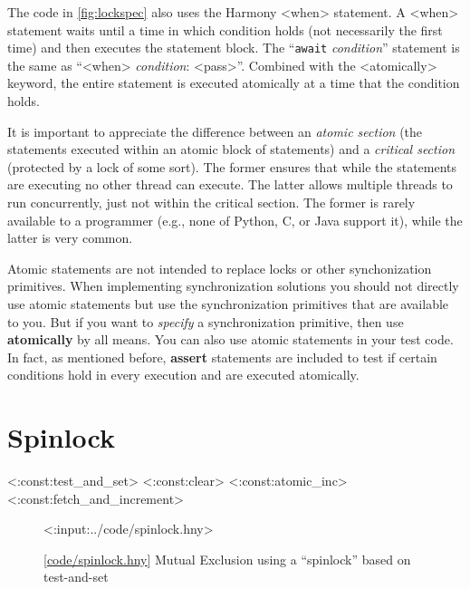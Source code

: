 \documentclass{report}
\newcommand{\harmonylink}[1]{%
[\href{https://harmony.cs.cornell.edu/#1}{\underline{#1}}]%
}
\newenvironment{code}{
\tcolorbox
}{
\endtcolorbox
}
\begin{document}
The code in \autoref{fig:lockspec} also uses the Harmony <{when}>
statement.  A <{when}> statement waits until a time in which
condition holds (not necessarily the first time) and then executes the
statement block.  The ``\texttt{await} \textit{condition}'' statement is
the same as ``<{when}> \textit{condition}: <{pass}>''.
Combined with the <{atomically}> keyword, the entire statement
is executed atomically at a time that the condition holds.

It is important to appreciate the difference between an
\emph{atomic section} (the statements executed within an
atomic block of statements) and a \emph{critical section}
(protected by a lock of some sort).
The former ensures that while the
statements are executing no other thread can execute.
The latter allows multiple threads to run concurrently,
just not within the critical section.
The former is rarely available to a programmer (e.g., none of
Python, C, or Java support it), while the latter
is very common.

Atomic statements
are not intended to replace locks or other synchonization primitives.
When implementing synchronization solutions you should not directly use
atomic statements but use the synchronization primitives that are available
to you.  But if you want to \emph{specify} a synchronization primitive,
then use \textbf{atomically} by all means.
You can also use atomic statements in your test code.
In fact, as mentioned before, \textbf{assert} statements are included to
test if certain conditions hold in every execution and are executed
atomically.

\chapter{Spinlock}
\label{ch:spinlock}
%

<{:const:test_and_set}>
<{:const:clear}>
<{:const:atomic_inc}>
<{:const:fetch_and_increment}>

%

\begin{figure}
\begin{code}
<{:input:../code/spinlock.hny}>
\end{code}
\caption{\harmonylink{code/spinlock.hny} Mutual Exclusion using a ``spinlock'' based on test-and-set}
\label{fig:tas}
\end{figure}
\end{document}

